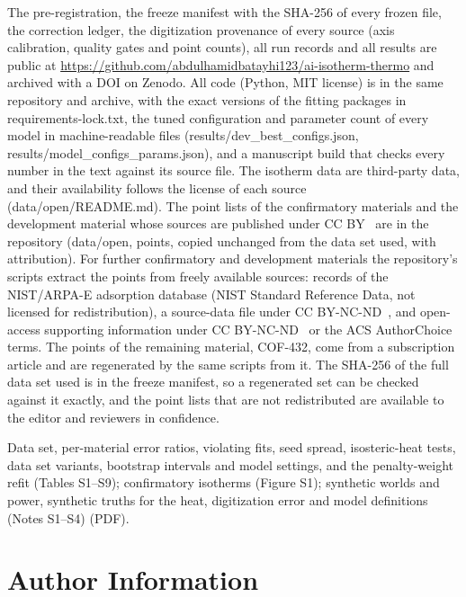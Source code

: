 \documentclass[journal=jcisd8,manuscript=article]{achemso}
\begin{document}
The pre-registration, the freeze manifest with the SHA-256 of every frozen file, the correction ledger, the
digitization provenance of every source (axis calibration, quality gates and point counts), all run records and all
results are public at \url{https://github.com/abdulhamidbatayhi123/ai-isotherm-thermo} and archived with a DOI
on Zenodo\cite{zenodo_p3a}. All code (Python, MIT license) is in the same repository and archive, with the exact
versions of the fitting packages in requirements-lock.txt, the tuned configuration and parameter count of every model in machine-readable files
(results/dev\_best\_configs.json, results/model\_configs\_params.json), and a
manuscript build that checks every number in the text against its source file. The isotherm data are third-party
data, and their availability follows the license of each source (data/open/README.md). The point lists of the
 confirmatory materials and the  development material whose sources are published under
CC BY~ are in the repository (data/open,  points, copied unchanged from the data set used,
with attribution). For  further confirmatory and  development materials the
repository's scripts extract the points from freely available sources: records of the NIST/ARPA-E adsorption
database\cite{isodb} (NIST Standard Reference Data, not licensed for redistribution), a source-data file under
CC BY-NC-ND~, and open-access supporting information under CC BY-NC-ND~ or the ACS AuthorChoice
terms. The points of the remaining
material, COF-432, come from a subscription article and are regenerated by the same scripts from it. The SHA-256 of
the full data set used is in the freeze manifest, so a regenerated set can be checked against it exactly, and the
point lists that are not redistributed are available to the editor and reviewers in confidence.

\begin{suppinfo}
Data set, per-material error ratios, violating fits, seed spread, isosteric-heat tests, data set variants, bootstrap
intervals and model settings, and the penalty-weight refit (Tables S1--S9); confirmatory isotherms (Figure S1); synthetic worlds and power,
synthetic truths for the heat, digitization error and model definitions (Notes S1--S4) (PDF).
\end{suppinfo}

\section*{Author Information}
\end{document}
